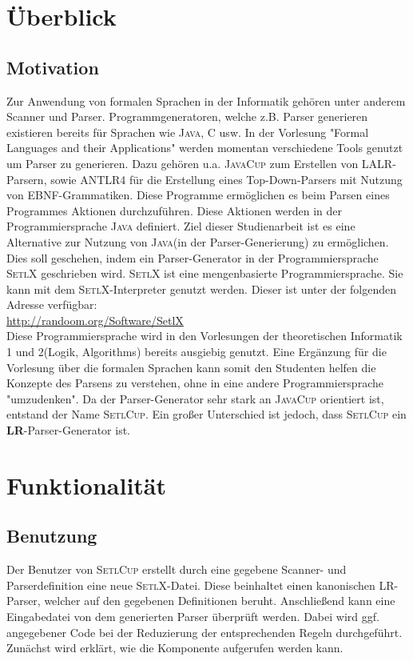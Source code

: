 \section{Überblick}
\subsection{Motivation}
Zur Anwendung von formalen Sprachen in der Informatik gehören unter anderem Scanner und Parser\cite{Aho86}. 
Programmgeneratoren, welche z.B. Parser generieren existieren bereits für Sprachen wie \textsc{Java}\cite{javacup:2016}, \textsc{C}\cite{donnelly1990} usw.
In der Vorlesung "Formal Languages and their Applications"\cite{stroetmann:formallanguages} werden momentan verschiedene Tools genutzt um Parser zu generieren. Dazu gehören u.a. \textsc{JavaCup} zum Erstellen von LALR-Parsern, sowie \textsc{ANTLR4}\cite{parr:2012} für die Erstellung eines Top-Down-Parsers mit Nutzung von EBNF-Grammatiken. Diese Programme ermöglichen es  beim Parsen eines Programmes Aktionen durchzuführen. Diese Aktionen werden in der Programmiersprache \textsc{Java} definiert.
Ziel dieser Studienarbeit ist es eine Alternative zur Nutzung von \textsc{Java}(in der Parser-Generierung) zu ermöglichen. Dies soll geschehen, indem ein Parser-Generator in der Programmiersprache \textsc{SetlX} geschrieben wird. \textsc{SetlX} ist eine mengenbasierte Programmiersprache. Sie kann mit dem \textsc{SetlX}-Interpreter genutzt werden. Dieser ist unter der folgenden Adresse verfügbar:\\
\href{http://randoom.org/Software/SetlX}{{http://randoom.org/Software/SetlX}}\\
Diese Programmiersprache wird in den Vorlesungen der theoretischen Informatik 1 und 2(Logik\cite{stroetmann:logic}, Algorithms\cite{stroetmann:algorithms}) bereits ausgiebig genutzt. Eine Ergänzung für die Vorlesung über die formalen Sprachen kann somit den Studenten helfen die Konzepte des Parsens zu verstehen, ohne in eine andere Programmiersprache "umzudenken". Da der Parser-Generator sehr stark an \textsc{JavaCup} orientiert ist, entstand der Name \textsc{SetlCup}. Ein großer Unterschied ist jedoch, dass \textsc{SetlCup} ein \textbf{LR}-Parser-Generator ist.
\section{Funktionalität}
\subsection{Benutzung}
Der Benutzer von \textsc{SetlCup} erstellt durch eine gegebene Scanner- und Parserdefinition eine neue \textsc{SetlX}-Datei. Diese beinhaltet einen kanonischen LR-Parser, welcher auf den gegebenen Definitionen beruht. Anschließend kann eine Eingabedatei von dem generierten Parser überprüft werden. Dabei wird ggf. angegebener Code bei der Reduzierung der entsprechenden Regeln durchgeführt. 
Zunächst wird erklärt, wie die Komponente aufgerufen werden kann.
